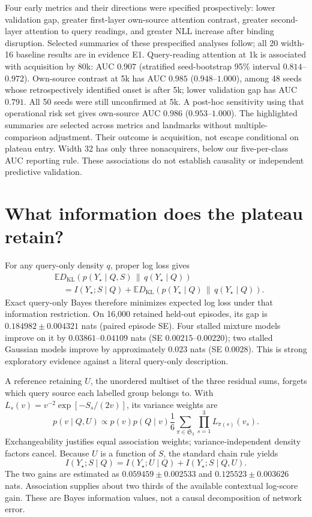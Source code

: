 \documentclass[10pt]{article}
\newcommand{\E}{\mathbb{E}}
\newcommand{\KL}{D_{\mathrm{KL}}}
\begin{document}
Four early metrics and their directions were specified prospectively: lower
validation gap, greater first-layer own-source attention contrast, greater
second-layer attention to query readings, and greater NLL increase after binding
disruption. Selected summaries of these prespecified analyses follow; all
20 width-16 baseline results are in evidence E1. Query-reading attention at 1k
is associated with acquisition by 80k: AUC $0.907$ (stratified seed-bootstrap 95\% interval
$0.814$--$0.972$). Own-source contrast at 5k has AUC $0.985$
($0.948$--$1.000$), among 48 seeds whose retrospectively identified onset is
after 5k; lower validation gap has AUC $0.791$. All 50 seeds were still
unconfirmed at 5k. A post-hoc sensitivity using that operational risk set gives
own-source AUC $0.986$ ($0.953$--$1.000$).
The highlighted summaries are selected across metrics and landmarks without
multiple-comparison adjustment. Their outcome is acquisition,
not escape conditional on plateau entry. Width 32 has only three
nonacquirers, below our five-per-class AUC reporting rule. These associations
do not establish causality or independent predictive validation.

\section{What information does the plateau retain?}
For any query-only density $q$, proper log loss gives
\begin{align}
&\E\KL\!\left(p(Y_\star\mid Q,S)\,\|\,q(Y_\star\mid Q)\right) \nonumber\\
&\quad=I(Y_\star;S\mid Q)
 +\E\KL\!\left(p(Y_\star\mid Q)\,\|\,q(Y_\star\mid Q)\right).
\end{align}
Exact query-only Bayes therefore minimizes expected log loss under that
information restriction. On 16,000 retained held-out episodes, its gap is
$0.184982\pm0.004321$ nats (paired episode SE). Four stalled mixture models
improve on it by $0.03861$--$0.04109$ nats (SE $0.00215$--$0.00220$);
two stalled Gaussian models improve by approximately $0.023$ nats
(SE $0.0028$). This is strong exploratory evidence against a literal
query-only description.

A reference retaining $U$, the unordered multiset of the three residual sums,
forgets which query source each labelled group belongs to. With
$L_s(v)=v^{-2}\exp[-S_s/(2v)]$, its variance weights are
\begin{equation}
p(v\mid Q,U)\propto p(v)p(Q\mid v)
\frac{1}{6}\sum_{\pi\in\mathfrak S_3}\prod_{s=1}^3 L_{\pi(s)}(v_s).
\label{eq:blind}
\end{equation}
Exchangeability justifies equal association weights; variance-independent density
factors cancel. Because $U$ is a function of $S$, the standard chain rule yields
\begin{equation}
I(Y_\star;S\mid Q)=I(Y_\star;U\mid Q)+I(Y_\star;S\mid Q,U).
\end{equation}
The two gains are estimated as $0.059459\pm0.002533$ and
$0.125523\pm0.003626$ nats. Association supplies about two thirds of the
available contextual log-score gain. These are Bayes information values,
not a causal decomposition of network error.
\end{document}
